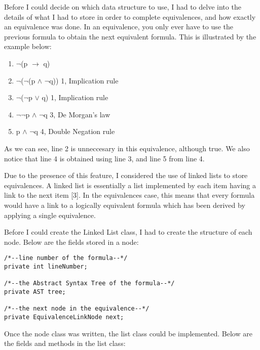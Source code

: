 \documentclass{report}
\begin{document}
Before I could decide on which data structure to use, I had to delve into the details
of what I had to store in order to complete equivalences, and how exactly an
equivalence was done. In an equivalence, you only ever have to use the previous
formula to obtain the next equivalent formula. This is illustrated by the 
example below:

\begin{enumerate}
    \item $\neg$(p $\to$ q)
		\item $\neg$($\neg$(p $\land$ $\neg$q)) \hfill 1, Implication rule
    \item $\neg$($\neg$p $\lor$ q) \hfill 1, Implication rule
    \item $\neg$$\neg$p $\land$ $\neg$q \hfill 3, De Morgan's law
    \item p $\land$ $\neg$q \hfill 4, Double Negation rule
\end{enumerate}

As we can see, line 2 is unneccesary in this equivalence, although true.
We also notice that line 4 is obtained using line 3, and line 5 from line 4.

Due to the presence of this feature, I considered the use of linked lists
to store equivalences. A linked list is essentially a list implemented by
each item having a link to the next item [3]. In the equivalences case, this
means that every formula would have a link to a logically equivalent formula
which has been derived by applying a single equivalence.

Before I could create the Linked List class, I had to create the structure of
each node. Below are the fields stored in a node:

\begin{lstlisting}[caption=Fields held in a list node, label=find]
/*--line number of the formula--*/
private int lineNumber;

/*--the Abstract Syntax Tree of the formula--*/
private AST tree;

/*--the next node in the equivalence--*/
private EquivalenceLinkNode next;
\end{lstlisting}

Once the node class was written, the list class could be implemented. Below
are the fields and methods in the list class:
\end{document}
